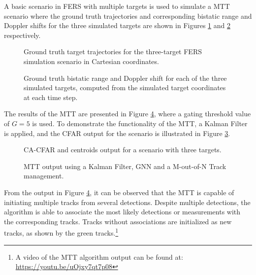 A basic scenario in \ac{FERS} with multiple targets is used to simulate a \ac{MTT} scenario where the ground truth trajectories and corresponding bistatic range and Doppler shifts for the three simulated targets are shown in Figures \ref{fig:mtt_targetpath} and \ref{fig:mtt_groundtruth} respectively.

\begin{figure}[H]
    \centering
    
    \caption{Ground truth target trajectories for the three-target FERS simulation scenario in Cartesian coordinates.}
    \label{fig:mtt_targetpath}
\end{figure}

\begin{figure}[H]
    \centering
    
    \caption{Ground truth bistatic range and Doppler shift for each 
    of the three simulated targets, computed from the simulated target 
    coordinates at each time step.}
    \label{fig:mtt_groundtruth}
\end{figure}

The results of the \ac{MTT} are presented in Figure \ref{fig:mtt_cfar_results}, where a gating threshold value of \(G = 5\) is used. To demonstrate the functionality of the \ac{MTT}, a Kalman Filter is applied, and the \ac{CFAR} output for the scenario is illustrated in Figure \ref{fig:mtt_cfar}.

\begin{figure}[H]
    \centering
    
    \caption{CA-CFAR and centroids output for a scenario with three targets.}
    \label{fig:mtt_cfar}
\end{figure}

\begin{figure}[H]
    \centering
    
    \caption{MTT output using a Kalman Filter, GNN and a M-out-of-N Track management.}
    \label{fig:mtt_cfar_results}
\end{figure}

From the output in Figure \ref{fig:mtt_cfar_results}, it can be observed that the \ac{MTT} is capable of initiating multiple tracks from several detections. Despite multiple detections, the algorithm is able to associate the most likely detections or measurements with the corresponding tracks. Tracks without associations are initialized as new tracks, as shown by the green tracks.\footnote{A video of the \ac{MTT} algorithm output can be found at: \url{https://youtu.be/uOjxy7qt7p08}}

